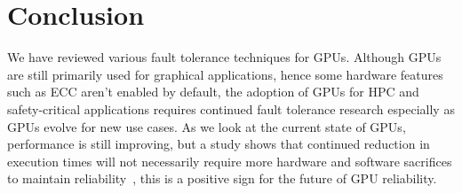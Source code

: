 \documentclass{article}
\begin{document}
\section{Conclusion}
We have reviewed various fault tolerance techniques for GPUs. Although GPUs are still primarily used for graphical applications, hence some hardware features such as ECC aren't enabled by default, the adoption of GPUs for HPC and safety-critical applications requires continued fault tolerance research especially as GPUs evolve for new use cases. As we look at the current state of GPUs, performance is still improving, but a study shows that continued reduction in execution times will not necessarily require more hardware and software sacrifices to maintain reliability~\cite{conclusion}, this is a positive sign for the future of GPU reliability.

\end{document}
